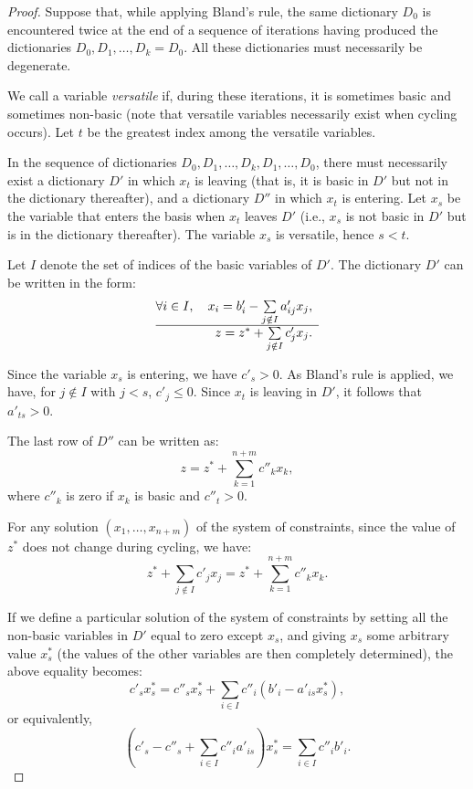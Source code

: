 \begin{proof}
    Suppose that, while applying Bland's rule, the same dictionary $D_0$ is encountered twice at the end of a sequence of iterations having produced the dictionaries $D_0, D_1, \dots, D_k = D_0$. All these dictionaries must necessarily be degenerate.

    We call a variable \emph{versatile} if, during these iterations, it is sometimes basic and sometimes non-basic (note that versatile variables necessarily exist when cycling occurs). Let $t$ be the greatest index among the versatile variables.

    In the sequence of dictionaries $D_0, D_1, \dots, D_k, D_1, \dots, D_0$, there must necessarily exist a dictionary $D'$ in which $x_t$ is leaving (that is, it is basic in $D'$ but not in the dictionary thereafter), and a dictionary $D''$ in which $x_t$ is entering. Let $x_s$ be the variable that enters the basis when $x_t$ leaves $D'$ (i.e., $x_s$ is not basic in $D'$ but is in the dictionary thereafter). The variable $x_s$ is versatile, hence $s < t$.

    Let $I$ denote the set of indices of the basic variables of $D'$. The dictionary $D'$ can be written in the form:
    \[
        \begin{array}{@{}rcl@{}}
        \forall i \in I, \quad x_i = b_i' - \sum\limits_{j \notin I} a_{ij}' x_j, \\
        \hline z = z^* + \sum\limits_{j \notin I} c_j' x_j .
        \end{array}
    \]

    Since the variable $x_s$ is entering, we have $c'_s > 0$. As Bland's rule is applied, we have, for $j \notin I$ with $j < s$, $c'_j \leqslant 0$. Since $x_t$ is leaving in $D'$, it follows that $a'_{ts} > 0$.

    The last row of $D''$ can be written as:
    \[
    z = z^* + \sum_{k=1}^{n+m} c''_k x_k ,
    \]
    where $c''_k$ is zero if $x_k$ is basic and $c''_t > 0$.

    For any solution $(x_1, \dots, x_{n+m})$ of the system of constraints, since the value of $z^*$ does not change during cycling, we have:
    \[
    z^* + \sum_{j \notin I} c'_j x_j = z^* + \sum_{k=1}^{n+m} c''_k x_k .
    \]

    If we define a particular solution of the system of constraints by setting all the non-basic variables in $D'$ equal to zero except $x_s$, and giving $x_s$ some arbitrary value $x^*_s$ (the values of the other variables are then completely determined), the above equality becomes:
    \[
    c'_s x^*_s = c''_s x^*_s + \sum_{i \in I} c''_i (b'_i - a'_{is} x^*_s) ,
    \]
    or equivalently,
    \[
    \left(c'_s - c''_s + \sum_{i \in I} c''_i a'_{is}\right) x^*_s = \sum_{i \in I} c''_i b'_i .
    \]


\end{proof}
